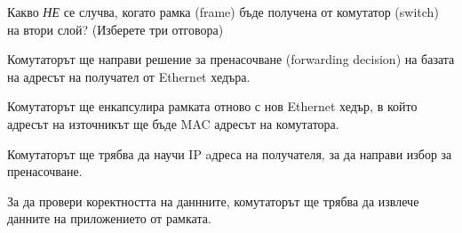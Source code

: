\question[6] Какво \emph{НЕ} се случва, когато рамка
(\foreignlanguage{english}{frame}) бъде получена от комутатор
(\foreignlanguage{english}{switch}) на втори слой? (Изберете три отговора)

\begin{choices}
  \choice Комутаторът ще направи решение за пренасочване
  (\foreignlanguage{english}{forwarding decision}) на базата на адресът на
  получател от \foreignlanguage{english}{Ethernet} хедъра.

  \CorrectChoice Комутаторът ще енкапсулира рамката отново с нов Ethernet хедър,
  в който адресът на източникът ще бъде MAC адресът на комутатора.

  \CorrectChoice Комутаторът ще трябва да научи IP aдреса на получателя, за да
  направи избор за пренасочване.

  \CorrectChoice За да провери коректността на даннните, комутаторът ще трябва
  да извлече данните на приложението от рамката.
\end{choices}